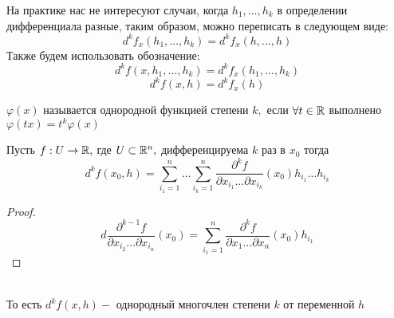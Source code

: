 \begin{remark}
	На практике нас не интересуют случаи, когда $h_1, \ldots, h_k$ в определении дифференциала разные, таким образом, можно переписать в следующем виде:
	\[ d^kf_x(h_1, \ldots, h_k) = d^kf_x(h, \ldots, h) \]
	Также будем использовать обозначение:
	\[ d^kf(x, h_1, \ldots, h_k) = d^kf_x (h_1, \ldots, h_k) \]
	\[ d^kf(x, h) = d^kf_x (h) \]
\end{remark}

\begin{definition}
	$\varphi(x)$ называется однородной функцией степени $k,$ если $\forall t \in \mathbb{R}$ выполнено $\varphi(tx) = t^k \varphi(x)$
\end{definition}

\begin{claim}
	Пусть $f : U \to \mathbb{R},$ где $U \subset \mathbb{R}^n,$ дифференцируема $k$ раз в $x_0$ тогда
	\[ d^kf(x_0, h) = \sum_{i_1 = 1}^n \ldots \sum_{i_k = 1}^n \frac{\partial^kf}{\partial x_{i_1} \ldots \partial x_{i_k}}(x_0) h_{i_1} \ldots h_{i_k} \]
	\begin{proof}
		\[ d\frac{\partial^{k-1}f}{\partial x_{i_2} \ldots \partial x_{i_n}}(x_0) = \sum_{i_1 = 1}^n \frac{\partial^k f}{\partial x_1 \ldots \partial x_n}(x_0) h_{i_1} \]
	\end{proof}\\
	То есть $d^kf(x, h) - $ однородный многочлен степени $k$ от переменной $h$
\end{claim}

